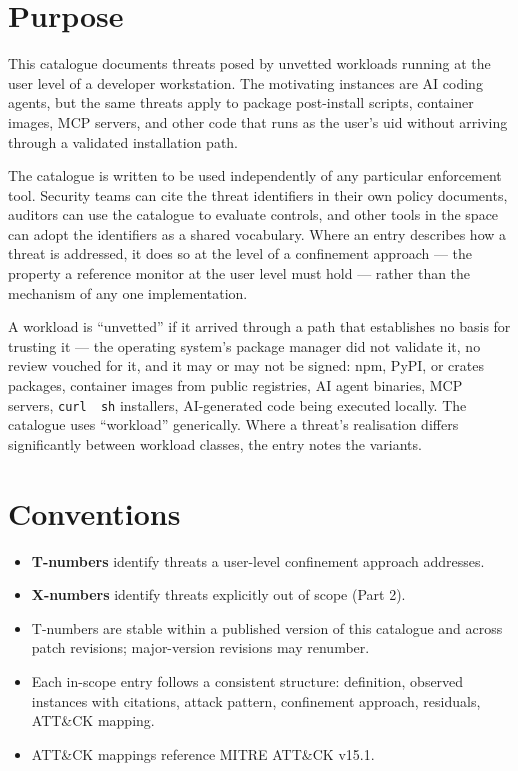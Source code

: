 \hypertarget{purpose}{%
\chapter{Purpose}\label{purpose}}

This catalogue documents threats posed by unvetted workloads running at
the user level of a developer workstation. The motivating instances are
AI coding agents, but the same threats apply to package post-install
scripts, container images, MCP servers, and other code that runs as the
user's uid without arriving through a validated installation path.

The catalogue is written to be used independently of any particular
enforcement tool. Security teams can cite the threat identifiers in
their own policy documents, auditors can use the catalogue to evaluate
controls, and other tools in the space can adopt the identifiers as a
shared vocabulary. Where an entry describes how a threat is addressed,
it does so at the level of a confinement approach --- the property a
reference monitor at the user level must hold --- rather than the
mechanism of any one implementation.

A workload is ``unvetted'' if it arrived through a path that establishes
no basis for trusting it --- the operating system's package manager did
not validate it, no review vouched for it, and it may or may not be
signed: npm, PyPI, or crates packages, container images from public
registries, AI agent binaries, MCP servers,
\texttt{curl\ \textbar{}\ sh} installers, AI-generated code being
executed locally. The catalogue uses ``workload'' generically. Where a
threat's realisation differs significantly between workload classes, the
entry notes the variants.

\hypertarget{conventions}{%
\chapter{Conventions}\label{conventions}}

\begin{itemize}
\tightlist
\item
  \textbf{T-numbers} identify threats a user-level confinement approach
  addresses.
\item
  \textbf{X-numbers} identify threats explicitly out of scope (Part 2).
\item
  T-numbers are stable within a published version of this catalogue and
  across patch revisions; major-version revisions may renumber.
\item
  Each in-scope entry follows a consistent structure: definition,
  observed instances with citations, attack pattern, confinement
  approach, residuals, ATT\&CK mapping.
\item
  ATT\&CK mappings reference MITRE ATT\&CK v15.1.
\end{itemize}

